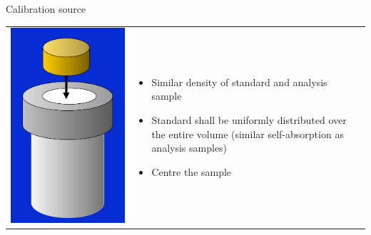 \begin{frame}{Calibration source}

\begin{table}
\begin{tabular}{m{}m{}}

\includegraphics[scale=0.2]{figures/calibration_position.png} & \begin{itemize}
\item Similar density of standard and analysis sample
\item Standard shall be uniformly distributed over the entire volume (similar self-absorption as analysis samples)
\item Centre the sample
\end{itemize}

\end{tabular}
\end{table}

\end{frame}

